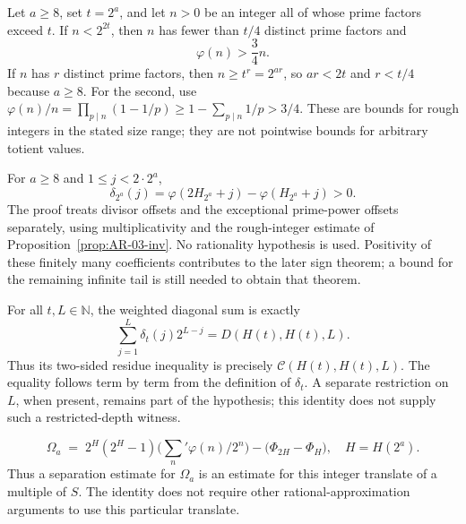 \begin{prop}\label{prop:AR-03-inv}
Let $a\ge8$, set $t=2^a$, and let $n>0$ be an integer all of
whose prime factors exceed $t$. If $n<2^{2t}$, then $n$ has fewer
than $t/4$ distinct prime factors and
\[
 \varphi(n)>\frac34 n.
\]
If $n$ has $r$ distinct prime factors, then
$n\ge t^r=2^{ar}$, so $ar<2t$ and $r<t/4$ because $a\ge8$.
For the second, use
$\varphi(n)/n=\prod_{p\mid n}(1-1/p)\ge1-\sum_{p\mid n}1/p>3/4$.
These are bounds for rough integers in the stated size range; they are
not pointwise bounds for arbitrary totient values.

\end{prop}

\begin{prop}\label{prop:AR-05-inv}
For $a\ge8$ and $1\le j<2\cdot2^a$,
\[
 \delta_{2^a}(j)=\varphi(2H_{2^a}+j)-\varphi(H_{2^a}+j)>0.
\]
The proof treats divisor offsets and the exceptional prime-power
offsets separately, using multiplicativity and the rough-integer
estimate of Proposition~\ref{prop:AR-03-inv}. No rationality hypothesis
is used. Positivity of these finitely many coefficients contributes to
the later sign theorem; a bound for the remaining infinite tail is
still needed to obtain that theorem.

\end{prop}

\begin{prop}\label{prop:AR-06-inv}
For all $t,L\in\mathbb N$, the weighted diagonal sum is exactly
\[
 \sum_{j=1}^{L}\delta_t(j)2^{L-j}=D(H(t),H(t),L).
\]
Thus its two-sided residue inequality is precisely
$\mathcal C(H(t),H(t),L)$. The equality follows term by term from the
definition of $\delta_t$. A separate restriction on $L$, when present,
remains part of the hypothesis; this identity does not supply such a
restricted-depth witness.

\end{prop}

\begin{prop}\label{prop:SEP-01-inv}
\[
\Omega_a \;=\; 2^H(2^H-1)\Big(\textstyle\sum_n' \varphi(n)/2^n\Big) - \big(\Phi_{2H}-\Phi_H\big),\quad H={H}(2^a).
\]
Thus a separation estimate for $\Omega_a$ is an estimate for this
integer translate of a multiple of $S$. The identity does not require
other rational-approximation arguments to use this particular translate.
\end{prop}

